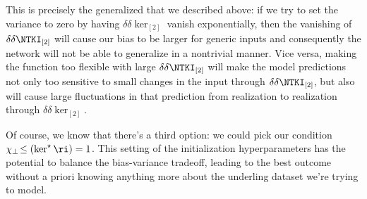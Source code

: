 This is precisely the generalized  that we described above: if we try to set the variance to zero by having $\delta\delta\ker_{[2]}$ vanish exponentially, then the vanishing of $\delta\delta\NTKI_{[2]}$ will cause our bias to be larger for generic inputs and consequently the network will not be able to generalize in a nontrivial manner. Vice versa, making the function too flexible with large $\delta\delta\NTKI_{[2]}$ will make the model predictions not only too sensitive to small changes in the input through $\delta\delta\NTKI_{[2]}$, but also will cause large fluctuations in that prediction from realization to realization through $\delta\delta\ker_{[2]}$.

Of course, we know that there's a third option: we could pick our  condition $\chi_\perp\!\le(\ker^\star\ri) =1$. This setting of the initialization hyperparameters has the potential to balance the bias-variance tradeoff, leading to the best outcome without a priori knowing anything more about the underling dataset we're trying to model.



